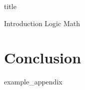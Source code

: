 \documentclass{article}
\begin{document}
{title}

\frontmatter



\mainmatter

{Introduction}
{Logic}
{Math}

\section{Conclusion}
\textit{}

\newpage
\printbibliography[heading = bibintoc, title = Bibliography]    %

\addappendix
{example_appendix}

\end{document}
